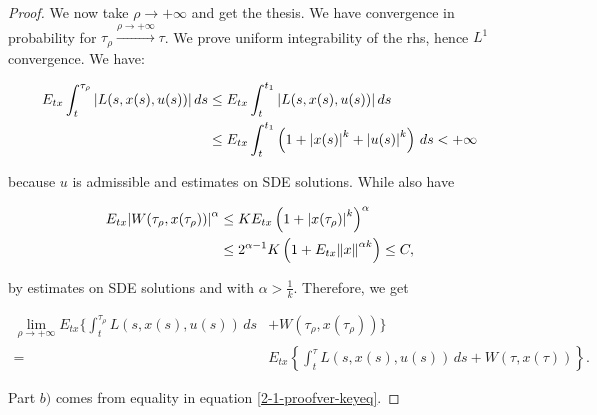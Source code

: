 \begin{theorem}
\begin{proof}
        We now take $\rho\to+\infty$ and get the thesis. We have convergence in probability for $\tau_{\rho}\xrightarrow{\rho\to+\infty}\tau$. 
        We prove uniform integrability of the rhs, hence $L^1$ convergence. We have:
        
        \begin{align*}
            E_{tx}\int_t^{\tau_{\rho}} \abs{L(s,x(s),u(s))}\,ds & \leq E_{tx}\int_t^{t_1}\abs{L(s,x(s),u(s))}\,ds \\
            & \leq E_{tx}\int_t^{t_1}\left(1+\abs{x(s)}^k+\abs{u(s)}^k\right)\,ds < +\infty    
        \end{align*}
        
        because $u$ is admissible and estimates on SDE solutions. While also have

        \begin{align*}
            E_{tx}\abs{W(\tau_{\rho},x(\tau_{\rho}))}^{\alpha} & \leq K E_{tx}\left(1+\abs{x(\tau_{\rho})}^k\right)^{\alpha} \\
            & \leq 2^{\alpha-1}K\left(1+E_{tx}\norm{x}^{\alpha k}\right) \leq C,
        \end{align*}

        by estimates on SDE solutions and with $\alpha>\frac{1}{k}$. Therefore, we get

        \begin{align*}
            \lim_{\rho\to+\infty} E_{tx}\Bigg\{\int_t^{\tau_{\rho}} L(s,x(s),u(s))\,ds & + W(\tau_{\rho},x(\tau_{\rho}))\Bigg\} \\
            = & E_{tx}\left\{\int_t^{\tau} L(s,x(s),u(s))\,ds + W(\tau,x(\tau))\right\}.
        \end{align*}

        Part $b)$ comes from equality in equation \eqref{2-1-proofver-keyeq}.
    \end{proof}
\end{theorem}




